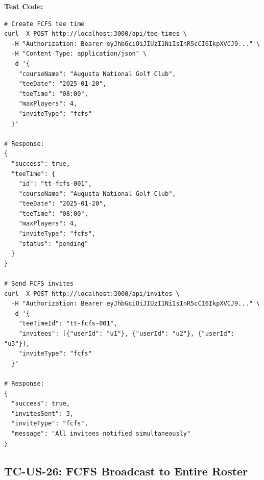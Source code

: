 \documentclass[11pt,a4paper]{article}
\begin{document}
\vspace{0.3cm}
\textbf{Test Code:}
\begin{lstlisting}
# Create FCFS tee time
curl -X POST http://localhost:3000/api/tee-times \
  -H "Authorization: Bearer eyJhbGciOiJIUzI1NiIsInR5cCI6IkpXVCJ9..." \
  -H "Content-Type: application/json" \
  -d '{
    "courseName": "Augusta National Golf Club",
    "teeDate": "2025-01-20",
    "teeTime": "08:00",
    "maxPlayers": 4,
    "inviteType": "fcfs"
  }'

# Response:
{
  "success": true,
  "teeTime": {
    "id": "tt-fcfs-001",
    "courseName": "Augusta National Golf Club",
    "teeDate": "2025-01-20",
    "teeTime": "08:00",
    "maxPlayers": 4,
    "inviteType": "fcfs",
    "status": "pending"
  }
}

# Send FCFS invites
curl -X POST http://localhost:3000/api/invites \
  -H "Authorization: Bearer eyJhbGciOiJIUzI1NiIsInR5cCI6IkpXVCJ9..." \
  -d '{
    "teeTimeId": "tt-fcfs-001",
    "invitees": [{"userId": "u1"}, {"userId": "u2"}, {"userId": "u3"}],
    "inviteType": "fcfs"
  }'

# Response:
{
  "success": true,
  "invitesSent": 3,
  "inviteType": "fcfs",
  "message": "All invitees notified simultaneously"
}
\end{lstlisting}

\vspace{0.5cm}


\subsection{TC-US-26: FCFS Broadcast to Entire Roster}
\end{document}

